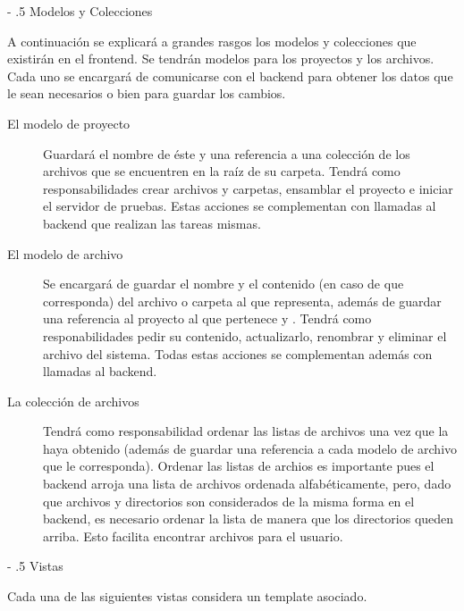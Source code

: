 \documentclass[12pt,titlepage,]{article}
\makeatletter
\renewcommand\subparagraph{%
   \@startsection{subparagraph}{4}{0mm}%
      {-\baselineskip}%
      {.5\baselineskip}%
      {\normalfont\normalsize\bfseries}}
\makeatother
\begin{document}
\subparagraph{Modelos y Colecciones}

A continuación se explicará a grandes rasgos los modelos y colecciones
que existirán en el frontend. Se tendrán modelos para los proyectos y
los archivos. Cada uno se encargará de comunicarse con el backend para
obtener los datos que le sean necesarios o bien para guardar los
cambios.

\begin{description}
\item[El modelo de proyecto]
Guardará el nombre de éste y una referencia a una colección de los
archivos que se encuentren en la raíz de su carpeta. Tendrá como
responsabilidades crear archivos y carpetas, ensamblar el proyecto e
iniciar el servidor de pruebas. Estas acciones se complementan con
llamadas al backend que realizan las tareas mismas.
\item[El modelo de archivo]
Se encargará de guardar el nombre y el contenido (en caso de que
corresponda) del archivo o carpeta al que representa, además de guardar
una referencia al proyecto al que pertenece y . Tendrá como
responabilidades pedir su contenido, actualizarlo, renombrar y eliminar
el archivo del sistema. Todas estas acciones se complementan además con
llamadas al backend.
\item[La colección de archivos]
Tendrá como responsabilidad ordenar las listas de archivos una vez que
la haya obtenido (además de guardar una referencia a cada modelo de
archivo que le corresponda). Ordenar las listas de archios es importante
pues el backend arroja una lista de archivos ordenada alfabéticamente,
pero, dado que archivos y directorios son considerados de la misma forma
en el backend, es necesario ordenar la lista de manera que los
directorios queden arriba. Esto facilita encontrar archivos para el
usuario.
\end{description}

\subparagraph{Vistas}

Cada una de las siguientes vistas considera un template asociado.
\end{document}
